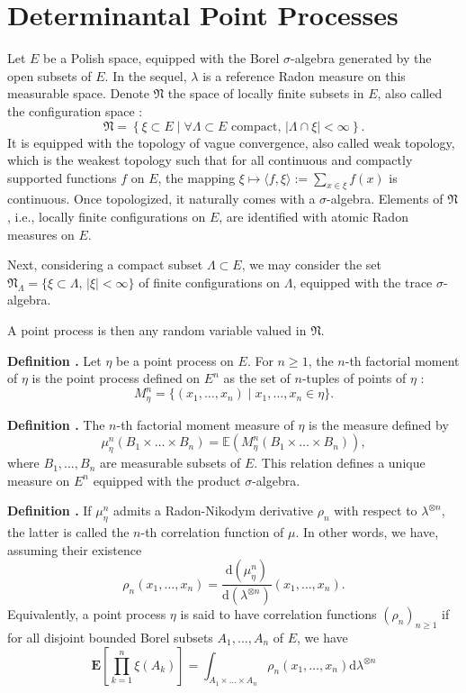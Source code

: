 \documentclass[11pt]{article}
\newcounter{cnt}
\newcommand{\cnt}{\thecnt \stepcounter{cnt}}
\begin{document}
\section{Determinantal Point Processes}

Let $E$ be a Polish space, equipped with the Borel $\sigma$-algebra generated by the open subsets of $E$. In the sequel, $\lambda$ is a reference Radon measure on this measurable space. Denote $\mathfrak{N}$ the space of locally finite subsets in $E$, also called the configuration space : $$ \mathfrak{N} = \left\{ \xi \subset E \mid \forall \Lambda \subset E \text{ compact},\, |\Lambda \cap \xi| < \infty \right\}. $$ 
It is equipped with the topology of vague convergence, also called weak topology, which is the weakest topology such that for all continuous and compactly supported functions $f$ on $E$, the mapping $ \xi \mapsto \langle f, \xi \rangle := \sum\limits_{x \in \xi} f(x) $ is continuous.  Once topologized, it naturally comes with a $\sigma$-algebra. Elements of $ \mathfrak N$, i.e., locally finite configurations on $E$, are identified with atomic Radon measures on $E$.

Next, considering a compact subset $\Lambda \subset E$, we may consider the set $\mathfrak{N}_\Lambda = \{\xi \subset \Lambda,\, |\xi| < \infty\}$ of finite configurations on $\Lambda$, equipped with the trace $\sigma$-algebra.

A point process is then any random variable valued in $\mathfrak{N}$.

\textbf{Definition \cnt.} Let $\eta$ be a point process on $E$. For $n \geq 1$, the $n$-th factorial moment of $\eta$ is the point process defined on $E^n$ as the set of $n$-tuples of points of $\eta$ : $$ M_\eta^n = \{(x_1, \dots, x_n) \mid x_1, \dots, x_n \in \eta\}. $$

\textbf{Definition \cnt.}
The $n$-th factorial moment measure of $\eta$ is the measure defined by $$ \mu_\eta^n(B_1 \times \dots \times B_n) = \mathbb{E}(M_\eta^n(B_1 \times \dots \times B_n)), $$ where $B_1, \dots, B_n$ are measurable subsets of $E$. This relation defines a unique measure on $E^n$ equipped with the product $\sigma$-algebra.

\textbf{Definition \cnt.} If $\mu_\eta^n$ admits a Radon-Nikodym derivative $\rho_n$ with respect to $\lambda^{\otimes n}$, the latter is called the $n$-th correlation function of $\mu$. In other words, we have, assuming their existence $$ \rho_n(x_1, \dots, x_n) = \frac{\mathrm d (\mu_\eta^n )}{\mathrm d (\lambda^{\otimes n})}(x_1, \dots, x_n). $$ Equivalently, a point process $\eta$ is said to have correlation functions $(\rho_n)_{n \geq 1}$ if for all disjoint bounded Borel subsets $A_1, \dots, A_n$ of $E$, we have $$ \mathbf E \left[ \prod_{k=1}^{n} \xi(A_k) \right] = \int_{A_1 \times \dots \times A_n} \rho_n(x_1, \dots, x_n) \mathrm d\lambda^{\otimes n} $$ 
\end{document}
